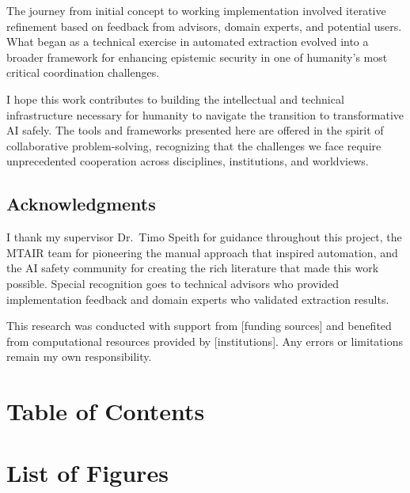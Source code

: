\documentclass[
  11pt,
  letterpaper,
]{book}
\begin{document}
The journey from initial concept to working implementation involved
iterative refinement based on feedback from advisors, domain experts,
and potential users. What began as a technical exercise in automated
extraction evolved into a broader framework for enhancing epistemic
security in one of humanity's most critical coordination challenges.

I hope this work contributes to building the intellectual and technical
infrastructure necessary for humanity to navigate the transition to
transformative AI safely. The tools and frameworks presented here are
offered in the spirit of collaborative problem-solving, recognizing that
the challenges we face require unprecedented cooperation across
disciplines, institutions, and worldviews.

\section*{Acknowledgments}\label{acknowledgments-1}


I thank my supervisor Dr.~Timo Speith for guidance throughout this
project, the MTAIR team for pioneering the manual approach that inspired
automation, and the AI safety community for creating the rich literature
that made this work possible. Special recognition goes to technical
advisors who provided implementation feedback and domain experts who
validated extraction results.

This research was conducted with support from {[}funding sources{]} and
benefited from computational resources provided by {[}institutions{]}.
Any errors or limitations remain my own responsibility.


\chapter*{Table of Contents}\label{table-of-contents}



\chapter*{List of Figures}\label{list-of-figures}
\end{document}
